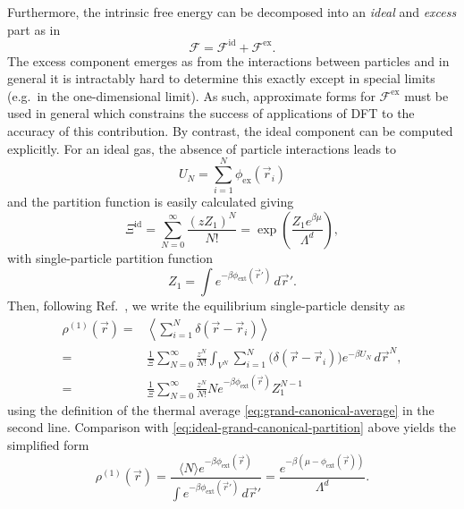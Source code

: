 Furthermore, the intrinsic free energy can be decomposed into an \emph{ideal} and \emph{excess} part as in
\begin{equation}\label{eq:F-decomposition}
  \mathcal{F}
  =
  \mathcal{F}^\mathrm{id} +
  \mathcal{F}^\mathrm{ex}.
\end{equation}
The excess component emerges as from the interactions between particles and in general it is intractably hard to determine this exactly except in special limits (e.g.\ in the one-dimensional limit).
As such, approximate forms for $\mathcal{F}^\mathrm{ex}$ must be used in general which constrains the success of applications of DFT to the accuracy of this contribution.
By contrast, the ideal component can be computed explicitly.
For an ideal gas, the absence of particle interactions leads to
\begin{equation*}
  U_N = \sum_{i=1}^N \phi_\mathrm{ex}(\vec{r}_i)
\end{equation*}
and the partition function is easily calculated giving
\begin{equation}\label{eq:ideal-grand-canonical-partition}
  \Xi^\mathrm{id}
  =
  \sum_{N=0}^\infty
  \frac{(z Z_1)^N}{N!}
  =
  \exp{\left( \frac{Z_1 e^{\beta \mu}}{\Lambda^d} \right)},
\end{equation}
with single-particle partition function
\begin{equation*}
  Z_1 = \int e^{-\beta \phi_\mathrm{ext}(\vec{r}')} \, d\vec{r}'.
\end{equation*}
Then, following Ref.\ \cite{AshcroftAJP1996}, we write the equilibrium single-particle density as
\begin{equation*}
  \begin{split}
    \rho^{(1)}(\vec{r})
    =&
    \left\langle
    \sum_{i=1}^N \delta(\vec{r} - \vec{r}_i)
    \right\rangle
    \\
    =&
    \frac{1}{\Xi} \sum_{N=0}^\infty \frac{z^N}{N!}
    \int_{V^N} \sum_{i=1}^N \Big( \delta(\vec{r} - \vec{r}_i) \Big)
    e^{- \beta U_N} \, d\vec{r}^N,
    \\
    =&
    \frac{1}{\Xi} \sum_{N=0}^\infty \frac{z^N}{N!}
    N e^{-\beta \phi_\mathrm{ext}(\vec{r})} Z_1^{N-1}
  \end{split}
\end{equation*}
using the definition of the thermal average \eqref{eq:grand-canonical-average} in the second line.
Comparison with \eqref{eq:ideal-grand-canonical-partition} above yields the simplified form
\begin{equation}\label{eq:ideal-density}
  \rho^{(1)}(\vec{r})
  =
  \frac{
    \langle N \rangle e^{-\beta \phi_\mathrm{ext}(\vec{r})}
  }{
    \int e^{-\beta \phi_\mathrm{ext}(\vec{r}')} \, d\vec{r}'
  }
  =
  \frac{e^{-\beta (\mu - \phi_\mathrm{ext}(\vec{r}))}}{\Lambda^d}.
\end{equation}
